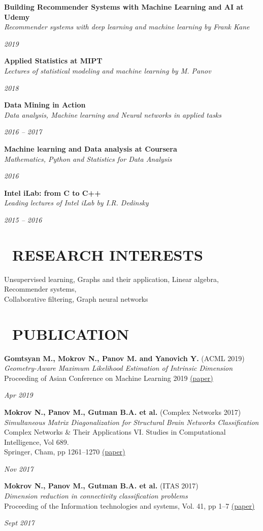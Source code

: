 \documentclass[11pt,a4paper,roman]{moderncv}
\newcommand*{\cvarticle}[7]{
    \parbox[t]{0.90\textwidth}
    {
        \textcolor{graycv}{\bfseries #2} ({\ithsape #3})\\
	    {\itshape #4} \\
    	{\footnotesize #5} \href{#6}{(#7)} \vspace{\parsep}
    }
    \parbox[t]{0.10\textwidth}{
    \hfill {\itshape #1}}
}
\newcommand*{\cvcourse}[3]{
    \parbox[t]{0.78\textwidth}{
        {\bfseries #2} \\ {\itshape #3}
    }
    \parbox[t]{0.22\textwidth}{
    \hfill {\itshape #1}}
}
\begin{document}
\cvcourse{2019}
          {Building Recommender Systems with Machine Learning and AI at Udemy}
          {Recommender systems with deep learning and machine learning by Frank Kane}
          
\cvcourse{2018}
          {Applied Statistics at MIPT}
          {Lectures of statistical modeling and machine learning by M. Panov}
          
\cvcourse{2016 -- 2017}
          {Data Mining in Action}
          {Data analysis, Machine learning and Neural networks in applied tasks}
          
\cvcourse{2016}
          {Machine learning and Data analysis at Coursera}
          {Mathematics, Python and Statistics for Data Analysis}
          
\cvcourse{2015 -- 2016}
          {Intel iLab: from C to C++}
          {Leading lectures of Intel iLab by I.R. Dedinsky}

\section{\faStreetView~RESEARCH INTERESTS}
Unsupervised learning, Graphs and their application, Linear algebra, Recommender systems,\\ Collaborative filtering, Graph neural networks
\section{\faBook~PUBLICATION}
\cvarticle{Apr 2019}
           {Gomtsyan M., Mokrov N., Panov M. and Yanovich Y.}
           {ACML 2019}
           {Geometry-Aware Maximum Likelihood Estimation of Intrinsic Dimension}
           {Proceeding of Asian Conference on Machine Learning 2019}
           {http://proceedings.mlr.press/v101/gomtsyan19a/gomtsyan19a.pdf}
           {paper}
           
\cvarticle{Nov 2017}
           {Mokrov N., Panov M., Gutman B.A. et al.}
           {Complex Networks 2017}
           {Simultaneous Matrix Diagonalization for Structural Brain Networks Classification}
           {Complex Networks \& Their Applications VI. Studies in Computational Intelligence, Vol 689. \\Springer, Cham, pp 1261--1270}
           {https://arxiv.org/pdf/1710.05213.pdf}
           {paper}
           
\cvarticle{Sept 2017}
           {Mokrov N., Panov M., Gutman B.A. et al.}
           {ITAS 2017}
           {Dimension reduction in connectivity classification problems}
           {Proceeding of the Information technologies and systems, Vol. 41, pp 1--7}
           {http://itas2017.iitp.ru/media/papers/1570391567_64mOmmp.pdf}
           {paper}
\end{document}
